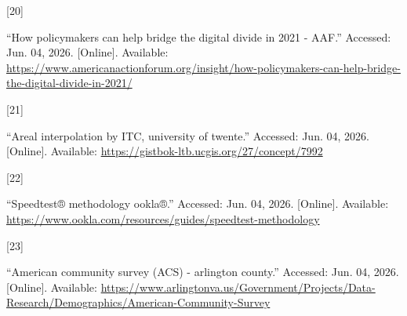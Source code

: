 \documentclass[
  letterpaper,
  DIV=11,
  numbers=noendperiod]{scrreprt}
\newlength{\cslhangindent}
\newlength{\csllabelwidth}
\newenvironment{CSLReferences}[2] %
 {\begin{list}{}{%
  \setlength{\itemindent}{0pt}
  \setlength{\leftmargin}{0pt}
  \setlength{\parsep}{0pt}
  \ifodd #1
   \setlength{\leftmargin}{\cslhangindent}
   \setlength{\itemindent}{-1\cslhangindent}
  \fi
  \setlength{\itemsep}{#2\baselineskip}}}
 {\end{list}}
\newcommand{\CSLLeftMargin}[1]{\parbox[t]{\csllabelwidth}{\strut#1\strut}}
\newcommand{\CSLRightInline}[1]{\parbox[t]{\linewidth - \csllabelwidth}{\strut#1\strut}}
\begin{document}
\begin{CSLReferences}{0}{0}
\CSLLeftMargin{{[}20{]} }%
\CSLRightInline{{``How policymakers can help bridge the digital divide
in 2021 - AAF.''} Accessed: Jun. 04, 2026. {[}Online{]}. Available:
\url{https://www.americanactionforum.org/insight/how-policymakers-can-help-bridge-the-digital-divide-in-2021/}}

\CSLLeftMargin{{[}21{]} }%
\CSLRightInline{{``Areal interpolation \textbar{} by ITC, university of
twente.''} Accessed: Jun. 04, 2026. {[}Online{]}. Available:
\url{https://gistbok-ltb.ucgis.org/27/concept/7992}}

\CSLLeftMargin{{[}22{]} }%
\CSLRightInline{{``Speedtest® methodology \textbar{} ookla®.''}
Accessed: Jun. 04, 2026. {[}Online{]}. Available:
\url{https://www.ookla.com/resources/guides/speedtest-methodology}}

\CSLLeftMargin{{[}23{]} }%
\CSLRightInline{{``American community survey (ACS) - arlington
county.''} Accessed: Jun. 04, 2026. {[}Online{]}. Available:
\url{https://www.arlingtonva.us/Government/Projects/Data-Research/Demographics/American-Community-Survey}}

\end{CSLReferences}
\end{document}
